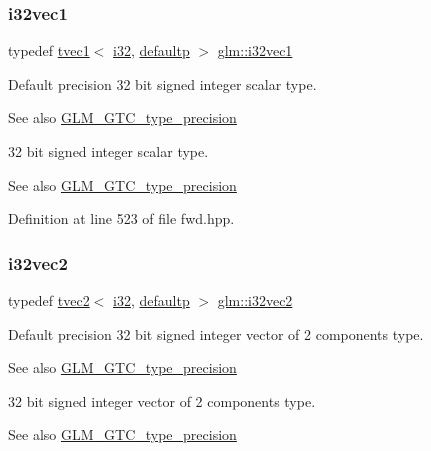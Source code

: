 \subsubsection{\texorpdfstring{i32vec1}{i32vec1}}
{\footnotesize\ttfamily typedef \mbox{\hyperlink{structglm_1_1tvec1}{tvec1}}$<$ \mbox{\hyperlink{group__gtc__type__precision_ga1d8ed5c43e91ea7d4528389da4fa9524}{i32}}, \mbox{\hyperlink{namespaceglm_a0f04f086094c747d227af4425893f545a9d21ccd8b5a009ec7eb7677befc3bf51}{defaultp}} $>$ \mbox{\hyperlink{group__gtc__type__precision_ga05a766bbe2ad0791ed0081baac492da7}{glm\+::i32vec1}}}

Default precision 32 bit signed integer scalar type. \begin{DoxySeeAlso}{See also}
\mbox{\hyperlink{group__gtc__type__precision}{G\+L\+M\+\_\+\+G\+T\+C\+\_\+type\+\_\+precision}}
\end{DoxySeeAlso}
32 bit signed integer scalar type. \begin{DoxySeeAlso}{See also}
\mbox{\hyperlink{group__gtc__type__precision}{G\+L\+M\+\_\+\+G\+T\+C\+\_\+type\+\_\+precision}} 
\end{DoxySeeAlso}


Definition at line 523 of file fwd.\+hpp.

\mbox{\label{group__gtc__type__precision_ga25820e641988fe33b075d80434872d02}} 
\subsubsection{\texorpdfstring{i32vec2}{i32vec2}}
{\footnotesize\ttfamily typedef \mbox{\hyperlink{structglm_1_1tvec2}{tvec2}}$<$ \mbox{\hyperlink{group__gtc__type__precision_ga1d8ed5c43e91ea7d4528389da4fa9524}{i32}}, \mbox{\hyperlink{namespaceglm_a0f04f086094c747d227af4425893f545a9d21ccd8b5a009ec7eb7677befc3bf51}{defaultp}} $>$ \mbox{\hyperlink{group__gtc__type__precision_ga25820e641988fe33b075d80434872d02}{glm\+::i32vec2}}}

Default precision 32 bit signed integer vector of 2 components type. \begin{DoxySeeAlso}{See also}
\mbox{\hyperlink{group__gtc__type__precision}{G\+L\+M\+\_\+\+G\+T\+C\+\_\+type\+\_\+precision}}
\end{DoxySeeAlso}
32 bit signed integer vector of 2 components type. \begin{DoxySeeAlso}{See also}
\mbox{\hyperlink{group__gtc__type__precision}{G\+L\+M\+\_\+\+G\+T\+C\+\_\+type\+\_\+precision}} 
\end{DoxySeeAlso}


